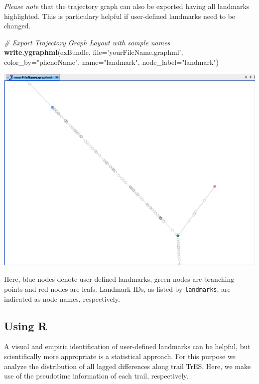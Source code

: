 \documentclass[]{book}
\newenvironment{Shaded}{\begin{snugshade}}{\end{snugshade}}
\newcommand{\KeywordTok}[1]{\textcolor[rgb]{0.13,0.29,0.53}{\textbf{#1}}}
\newcommand{\DataTypeTok}[1]{\textcolor[rgb]{0.13,0.29,0.53}{#1}}
\newcommand{\StringTok}[1]{\textcolor[rgb]{0.31,0.60,0.02}{#1}}
\newcommand{\CommentTok}[1]{\textcolor[rgb]{0.56,0.35,0.01}{\textit{#1}}}
\newcommand{\NormalTok}[1]{#1}
\theoremstyle{definition}
\theoremstyle{definition}
\theoremstyle{definition}
\theoremstyle{remark}
\begin{document}
\emph{Please note} that the trajectory graph can also be exported having
all landmarks highlighted. This is particulary helpful if user-defined
landmarks need to be changed.

\begin{Shaded}
\begin{Highlighting}[]
\CommentTok{# Export Trajectory Graph Layout with sample names}
\KeywordTok{write.ygraphml}\NormalTok{(exBundle, }\DataTypeTok{file=}\StringTok{'yourFileName.graphml'}\NormalTok{, }
               \DataTypeTok{color_by=}\StringTok{"phenoName"}\NormalTok{, }\DataTypeTok{name=}\StringTok{"landmark"}\NormalTok{, }
               \DataTypeTok{node_label=}\StringTok{"landmark"}\NormalTok{)}
\end{Highlighting}
\end{Shaded}

\includegraphics[width=23.17in]{img/yEd_9}

Here, blue nodes denote user-defined landmarks, green nodes are
branching points and red nodes are leafs. Landmark IDs, as listed by
\texttt{landmarks}, are indicated as node names, respectively.

\subsection{Using R}\label{using-r}

A visual and empiric identification of user-defined landmarks can be
helpful, but scientifically more appropriate is a statistical approach.
For this purpose we analyze the distribution of all lagged differences
along trail TrES. Here, we make use of the pseudotime information of
each trail, respectively.
\end{document}
